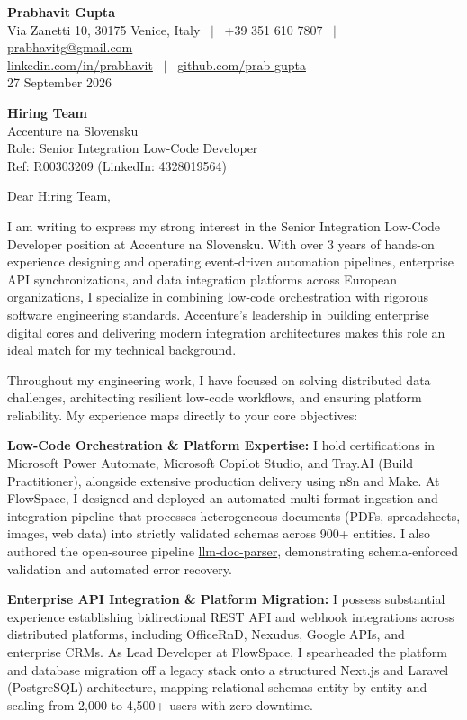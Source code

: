 \documentclass[11pt,a4paper]{article}
\begin{document}
\textbf{\large Prabhavit Gupta}\\
Via Zanetti 10, 30175 Venice, Italy ~$\vert$~ +39 351 610 7807 ~$\vert$~ \href{mailto:prabhavitg@gmail.com}{prabhavitg@gmail.com}\\
\href{https://www.linkedin.com/in/prabhavit/}{linkedin.com/in/prabhavit} ~$\vert$~ \href{https://github.com/prab-gupta}{github.com/prab-gupta}\\
27 September 2026

\textbf{Hiring Team}\\
Accenture na Slovensku\\
Role: Senior Integration Low-Code Developer\\
Ref: R00303209 (LinkedIn: 4328019564)

Dear Hiring Team,

I am writing to express my strong interest in the Senior Integration Low-Code Developer position at Accenture na Slovensku. With over 3 years of hands-on experience designing and operating event-driven automation pipelines, enterprise API synchronizations, and data integration platforms across European organizations, I specialize in combining low-code orchestration with rigorous software engineering standards. Accenture's leadership in building enterprise digital cores and delivering modern integration architectures makes this role an ideal match for my technical background.

Throughout my engineering work, I have focused on solving distributed data challenges, architecting resilient low-code workflows, and ensuring platform reliability. My experience maps directly to your core objectives:

\textbf{Low-Code Orchestration \& Platform Expertise:} I hold certifications in Microsoft Power Automate, Microsoft Copilot Studio, and Tray.AI (Build Practitioner), alongside extensive production delivery using n8n and Make. At FlowSpace, I designed and deployed an automated multi-format ingestion and integration pipeline that processes heterogeneous documents (PDFs, spreadsheets, images, web data) into strictly validated schemas across 900+ entities. I also authored the open-source pipeline \href{https://github.com/prab-gupta/llm-doc-parser}{llm-doc-parser}, demonstrating schema-enforced validation and automated error recovery.

\textbf{Enterprise API Integration \& Platform Migration:} I possess substantial experience establishing bidirectional REST API and webhook integrations across distributed platforms, including OfficeRnD, Nexudus, Google APIs, and enterprise CRMs. As Lead Developer at FlowSpace, I spearheaded the platform and database migration off a legacy stack onto a structured Next.js and Laravel (PostgreSQL) architecture, mapping relational schemas entity-by-entity and scaling from 2,000 to 4,500+ users with zero downtime.
\end{document}
